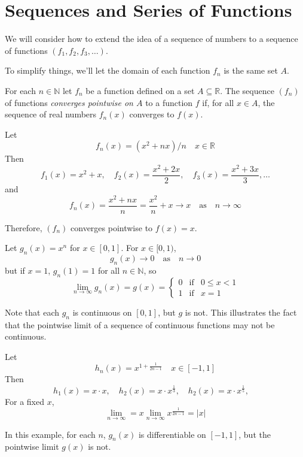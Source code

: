 \section{Sequences and Series of Functions}
We will consider how to extend the idea of a sequence of numbers to a sequence of functions $(f_1,f_2,f_3,\ldots)$.
\par\vspace{0.6 cm}
To simplify things, we'll let the domain of each function $f_n$ is the same set $A$.
\par\vspace{0.6 cm}
\begin{definition*} For each $n\in\mathbb{N}$ let $f_n$ be a function defined on a set $A\subseteq\mathbb{R}$. The sequence $(f_n)$ of functions \textit{converges pointwise on $A$} to a function $f$ if, for all $x\in A$, the sequence of real numbers $f_n(x)$ converges to $f(x)$. 
\end{definition*}
\par\vspace{0.6 cm}
\begin{example*}
Let 
\[
f_n(x) = (x^2+nx)/n\quad x\in\mathbb{R}
\]
Then
\[
f_1(x) = x^2+x,\quad f_2(x) = \frac{x^2+2x}{2},\quad f_3(x)=\frac{x^2+3x}{3},\ldots
\]
and
\[
f_n(x) = \frac{x^2+nx}{n} = \frac{x^2}{n}+x \rightarrow x\quad\mbox{as}\quad n\rightarrow\infty
\]
\par\vspace{0.6 cm}
Therefore, $(f_n)$ converges pointwise to $f(x)=x$.
\end{example*}
\begin{example*}
Let $g_n(x)=x^n$ for $x\in[0,1]$.  For $x\in[0,1)$, 
\[
g_n(x)\rightarrow 0\quad\mbox{as}\quad n\rightarrow0
\]  
but if $x=1$, $g_n(1)=1$ for all $n\in\mathbb{N}$, so
\[
\lim_{n\rightarrow\infty}g_n(x) = g(x) =\left\{\begin{array}{lcl}0 &\mbox{if}& 0\leq x <1\\1 &\mbox{if}& x=1\end{array}\right.
\]
\par\vspace{0.6 cm}
Note that each $g_n$ is continuous on $[0,1]$, but $g$ is not.  This illustrates the fact that the pointwise limit of a sequence of continuous functions may not be continuous.
\end{example*}
\par\vspace{0.6 cm}
\begin{example*}
Let 
\[
h_n(x) = x^{1+\frac{1}{2n-1}}\quad x\in[-1,1]
\]
Then
\[
h_1(x) = x\cdot x,\quad h_2(x) = x\cdot x^{\frac{1}{3}},\quad h_2(x) = x\cdot x^{\frac{1}{5}}, \quad
\]
For a fixed $x$, 
\[
\lim_{n\rightarrow\infty} = x\lim_{n\rightarrow\infty}x^{\frac{1}{2n-1}} = |x|
\]
\par\vspace{0.6 cm}
In this example, for each $n$, $g_n(x)$ is differentiable on $[-1,1]$, but the pointwise limit $g(x)$ is not.
\end{example*}
